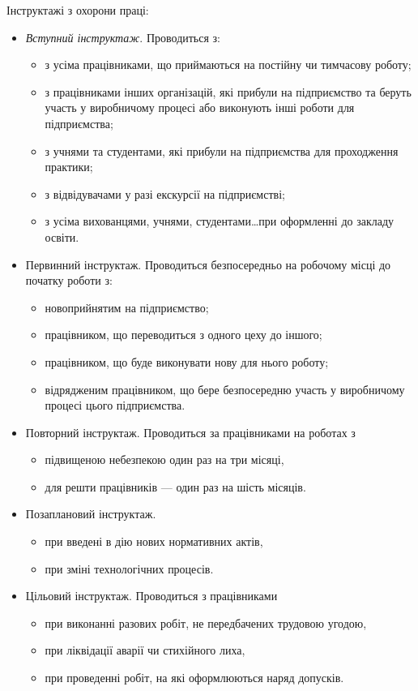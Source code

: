 \documentclass[a4paper,10pt,notitlepage,pdftex,headsepline]{scrartcl}
\begin{document}
  Інструктажі з охорони праці:
  \begin{itemize}
    \item \emph{Вступний інструктаж}.
      Проводиться з:
      \begin{itemize}
        \item з усіма працівниками, що приймаються на постійну чи тимчасову
          роботу;
        \item з працівниками інших організацій, які прибули на підприємство та
          беруть участь у виробничому процесі або виконують інші роботи для
          підприємства;
        \item з учнями та студентами, які прибули на підприємства для
          проходження практики;
        \item з відвідувачами у разі екскурсії на підприємстві;
        \item з усіма вихованцями, учнями, студентами\ldots при оформленні до
          закладу освіти.
      \end{itemize}
    \item Первинний інструктаж.
      Проводиться безпосередньо на робочому місці до початку роботи з:
      \begin{itemize}
        \item новоприйнятим на підприємство;
        \item працівником, що переводиться з одного цеху до іншого;
        \item працівником, що буде виконувати нову для нього роботу;
        \item відрядженим працівником, що бере безпосередню участь у
          виробничому процесі цього підприємства.
      \end{itemize}
    \item Повторний інструктаж.
      Проводиться за працівниками на роботах з
      \begin{itemize}
        \item підвищеною небезпекою один раз на три місяці,
        \item для решти працівників --- один раз на шість місяців.
      \end{itemize}
    \item Позаплановий інструктаж.
      \begin{itemize}
        \item при введені в дію нових нормативних актів,
        \item при зміні технологічних процесів.
      \end{itemize}
    \item Цільовий інструктаж.
      Проводиться з працівниками
      \begin{itemize}
        \item при виконанні разових робіт, не передбачених трудовою угодою,
        \item при ліквідації аварії чи стихійного лиха,
        \item при проведенні робіт, на які оформлюються наряд допусків.
      \end{itemize}
  \end{itemize}
\end{document}
